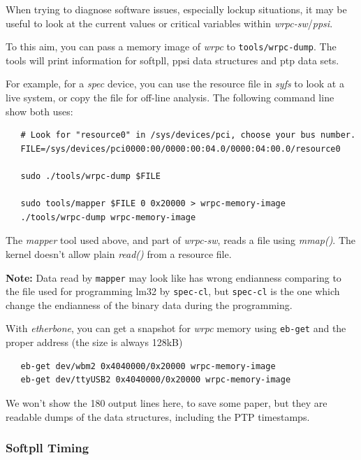 \documentclass[a4paper, 12pt]{article}
\begin{document}
When trying to diagnose software issues, especially lockup situations,
it may be useful to look at the current values or critical variables
within \textit{wrpc-sw}/\textit{ppsi}.

To this aim, you can pass a memory image of \textit{wrpc} to \texttt{tools/wrpc-dump}.
The tools will print information for softpll, ppsi data structures
and ptp data sets.

For example, for a \textit{spec} device, you can use the resource file in
\textit{syfs} to look at a live system, or copy the file for off-line
analysis. The following command line show both uses:

\begin{lstlisting}
   # Look for "resource0" in /sys/devices/pci, choose your bus number.
   FILE=/sys/devices/pci0000:00/0000:00:04.0/0000:04:00.0/resource0

   sudo ./tools/wrpc-dump $FILE

   sudo tools/mapper $FILE 0 0x20000 > wrpc-memory-image
   ./tools/wrpc-dump wrpc-memory-image
\end{lstlisting}

The \textit{mapper} tool used above, and part of \textit{wrpc-sw}, reads a file
using \textit{mmap()}. The kernel doesn't allow plain \textit{read()} from a
resource file.

\textbf{Note:} Data read by \texttt{mapper} may look like has wrong endianness comparing
to the file used for programming lm32 by \texttt{spec-cl}, but \texttt{spec-cl} is the
one which change the endianness of the binary data during the programming.

With \textit{etherbone}, you can get a snapshot for \textit{wrpc} memory using
\texttt{eb-get} and the proper address (the size is always 128kB)

\begin{lstlisting}
   eb-get dev/wbm2 0x4040000/0x20000 wrpc-memory-image
   eb-get dev/ttyUSB2 0x4040000/0x20000 wrpc-memory-image
\end{lstlisting}

We won't show the 180 output lines here, to save some paper, but they
are readable dumps of the data structures, including the PTP timestamps.

\subsubsection{Softpll Timing}
\label{spll Softpll Timing}
\end{document}
